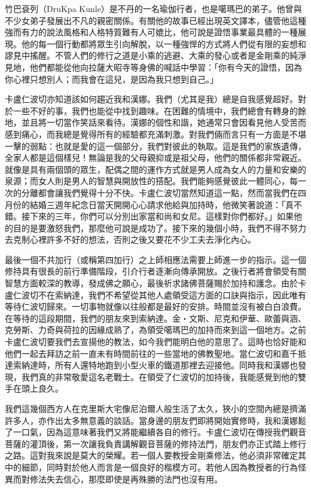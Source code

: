 竹巴袞列（DruKpa
Kunle）是不丹的一名瑜伽行者，也是噶瑪巴的弟子。他曾與不少女弟子發展出不凡的親密關係。有關他的故事已經出現英文譯本，儘管他這種強而有力的說法風格和人格特質難有人可媲比，他可說是證悟事業最具體的一種展現。他的每一個行動都將眾生引向解脫，以一種強悍的方式將人們從有限的妄想和謬見中搖醒。不管人們的修行之道是小乘的逃避、大乘的發心或者是金剛乘的純淨見地，他們都能從他向拉薩大昭寺等身佛的喊話中學習：「你有今天的證悟，因為你心裡只想別人；而我會在這兒，是因為我只想到自己。」

卡盧仁波切亦知道該如何趨近我和漢娜。我們（尤其是我）總是自我感覺超好。對於一些不好的事，我們也能從中找到趣味。在困難的情境中，我們總會有轉身的餘地，並且將一切當作笑話來看待。漢娜的個性和諧，她通常只會因看見他人受苦而感到痛心，而我總是覺得所有的經驗都充滿刺激。對我們倆而言只有一方面是不堪一擊的弱點：也就是愛的這一個部分，我們對彼此的執取。這是我們的家族遺傳，全家人都是這個樣兒！無論是我的父母親抑或是祖父母，他們的關係都非常親近。就像是具有兩個頭的眾生，配偶之間的運作方式就是男人成為女人的力量和安樂的泉源；而女人則是男人的智慧與開放性的搭配。我們能夠感覺彼此一體同心，每一次的分離都會讓我們覺得十分不快。卡盧仁波切當然知道這一點，然而當我們在四月份的結婚三週年紀念日當天開開心心請求他給與加持時，他微笑著說道：「真不錯。接下來的三年，你們可以分別出家當和尚和女尼。這樣對你們都好。」如果他的目的是要激怒我們，那麼他可說是成功了。接下來的幾個小時，我們不得不努力去克制心裡許多不好的想法，否則之後又要花不少工夫去淨化內心。

最後一個不共加行（或稱第四加行）之上師相應法需要上師進一步的指示。這一個修持具有很長的前行準備階段，引介行者逐漸向傳承開放。之後行者將會領受有關智慧方面較深的教導，發成佛之願心，最後祈求諸佛菩薩賜於加持和護念。由於卡盧仁波切不在索納達，我們不希望從其他人處領受這方面的口訣與指示，因此唯有等待仁波切歸來。一切事物就像以往般都是最好的安排。時間並沒有被白白浪費。在等待的這段期間，我們的朋友來到索納達。金‧文斯、尼克和伊華、歐蕾與涵、克勞斯、力奇與荷拉的因緣成熟了，為領受噶瑪巴的加持而來到這一個地方。之前卡盧仁波切要我們去宣揚他的教法，如今我們能明白他的意思了。這時也恰好能和他們一起去拜訪之前一直未有時間前往的一些當地的佛教聖地。當仁波切和嘉千抵達索納達時，所有人還特地跑到小型火車的鐵道那裡去迎接他。同時我和漢娜也發現，我們真的非常敬愛這名老戰士。在領受了仁波切的加持後，我能感覺到他的雙手在頭上良久。

我們這幾個西方人在克里斯大宅像尼泊爾人般生活了太久，狹小的空間內總是擠滿許多人，亦作出太多無意義的談話。當身邊的朋友們即將開始實修時，我和漢娜鬆了一口氣，因為這意味著我們又將能繼續各自的修行。卡盧仁波切在傳授我們觀音菩薩的灌頂後，第一次讓我負責講解觀音菩薩的修持法門，朋友們亦正式踏上修行之路。這對我來說是莫大的榮耀。若一個人要教授金剛乘修法，他必須非常確定其中的細節，同時對於他人而言是一個良好的楷模方可。若他人因為教授者的行為怪異而對修法失去信心，那麼即使是再殊勝的法門也沒有用。

